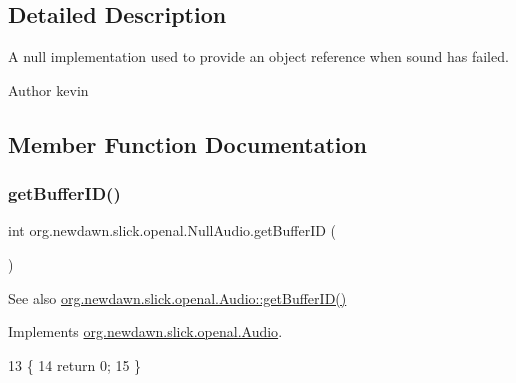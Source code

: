 \subsection{Detailed Description}
A null implementation used to provide an object reference when sound has failed.

\begin{DoxyAuthor}{Author}
kevin 
\end{DoxyAuthor}


\subsection{Member Function Documentation}
\mbox{\label{classorg_1_1newdawn_1_1slick_1_1openal_1_1_null_audio_a1451cb508be59521271ab423ea0785a7}} 
\subsubsection{\texorpdfstring{get\+Buffer\+I\+D()}{getBufferID()}}
{\footnotesize\ttfamily int org.\+newdawn.\+slick.\+openal.\+Null\+Audio.\+get\+Buffer\+ID (\begin{DoxyParamCaption}{ }\end{DoxyParamCaption})\hspace{0.3cm}{\ttfamily [inline]}}

\begin{DoxySeeAlso}{See also}
\mbox{\hyperlink{interfaceorg_1_1newdawn_1_1slick_1_1openal_1_1_audio_ac2a651989c7933bd896c7e0c382ba655}{org.\+newdawn.\+slick.\+openal.\+Audio\+::get\+Buffer\+I\+D()}} 
\end{DoxySeeAlso}


Implements \mbox{\hyperlink{interfaceorg_1_1newdawn_1_1slick_1_1openal_1_1_audio_ac2a651989c7933bd896c7e0c382ba655}{org.\+newdawn.\+slick.\+openal.\+Audio}}.


\begin{DoxyCode}
13                              \{
14         \textcolor{keywordflow}{return} 0;
15     \}
\end{DoxyCode}
\mbox{\label{classorg_1_1newdawn_1_1slick_1_1openal_1_1_null_audio_a66050286dce4cedbeed88489d6bd5d5f}} 
